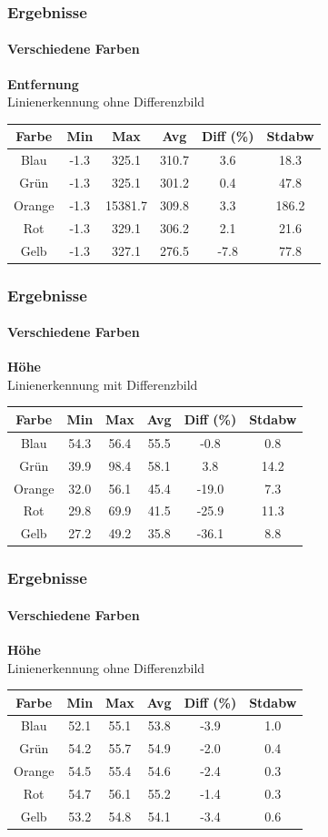 \documentclass[xcolor=dvipsnames]{beamer}
\begin{document}
\begin{frame}
	\frametitle{Ergebnisse}
	\framesubtitle{Verschiedene Farben}
		\textbf{Entfernung}\\
		
		Linienerkennung ohne Differenzbild
		\begin{tabular}{c|c|c|c|c|c}
			Farbe & Min & Max & Avg & Diff (\%) & Stdabw\\ \hline
Blau &-1.3 & 325.1 & 310.7 & 3.6 & 18.3\\
Grün &-1.3 & 325.1 & 301.2 & 0.4 & 47.8\\
Orange &-1.3 & 15381.7 & 309.8 & 3.3 & 186.2\\
Rot &-1.3 & 329.1 & 306.2 & 2.1 & 21.6\\
Gelb & -1.3 & 327.1 & 276.5 & -7.8 & 77.8\\
		\end{tabular}

\end{frame}


\begin{frame}
	\frametitle{Ergebnisse}
	\framesubtitle{Verschiedene Farben}
		\textbf{Höhe}\\
		
		Linienerkennung mit Differenzbild
		\begin{tabular}{c|c|c|c|c|c}
			Farbe & Min & Max & Avg & Diff (\%) & Stdabw\\ \hline
Blau &   54.3 & 56.4 & 55.5 & -0.8 & 0.8\\
Grün &    39.9 & 98.4 & 58.1 & 3.8 & 14.2\\
Orange&     32.0 & 56.1 & 45.4 & -19.0 & 7.3\\
Rot &    29.8 & 69.9 & 41.5 & -25.9 & 11.3\\
Gelb &     27.2 & 49.2 & 35.8 & -36.1 & 8.8\\

		\end{tabular}
		
		
\end{frame}

\begin{frame}
	\frametitle{Ergebnisse}
	\framesubtitle{Verschiedene Farben}
		\textbf{Höhe}\\
		
		Linienerkennung ohne Differenzbild
		\begin{tabular}{c|c|c|c|c|c}
			Farbe & Min & Max & Avg & Diff (\%) & Stdabw\\ \hline
Blau &    52.1 & 55.1 & 53.8 & -3.9 & 1.0\\
Grün &     54.2 & 55.7 & 54.9 & -2.0 & 0.4\\
Orange&     54.5 & 55.4 & 54.6 & -2.4 & 0.3\\
Rot &    54.7 & 56.1 & 55.2 & -1.4 & 0.3\\
Gelb &      53.2 & 54.8 & 54.1 & -3.4 & 0.6\\

		\end{tabular}
		
		
\end{frame}
\end{document}
